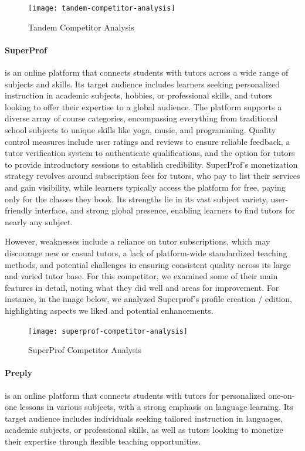 \begin{figure}[h]
    \centering
    \texttt{[image: tandem-competitor-analysis]}
    \caption{Tandem Competitor Analysis}
    \label{fig:figure8}
\end{figure}

\paragraph{SuperProf} is an online platform that connects students with tutors across a wide range of subjects and skills.
Its target audience includes learners seeking personalized instruction in academic subjects, hobbies, or professional skills, and tutors looking to offer their expertise to a global audience.
The platform supports a diverse array of course categories, encompassing everything from traditional school subjects to unique skills like yoga, music, and programming.
Quality control measures include user ratings and reviews to ensure reliable feedback, a tutor verification system to authenticate qualifications, and the option for tutors to provide introductory sessions to establish credibility.
SuperProf's monetization strategy revolves around subscription fees for tutors, who pay to list their services and gain visibility, while learners typically access the platform for free, paying only for the classes they book.
Its strengths lie in its vast subject variety, user-friendly interface, and strong global presence, enabling learners to find tutors for nearly any subject.

However, weaknesses include a reliance on tutor subscriptions, which may discourage new or casual tutors, a lack of platform-wide standardized teaching methods, and potential challenges in ensuring consistent quality across its large and varied tutor base.
For this competitor, we examined some of their main features in detail, noting what they did well and areas for improvement.
For instance, in the image below, we analyzed Superprof's profile creation / edition, highlighting aspects we liked and potential enhancements.

\begin{figure}[h]
    \centering
    \texttt{[image: superprof-competitor-analysis]}
    \caption{SuperProf Competitor Analysis}
    \label{fig:figure9}
\end{figure}

\paragraph{Preply} is an online platform that connects students with tutors for personalized one-on-one lessons in various subjects, with a strong emphasis on language learning.
Its target audience includes individuals seeking tailored instruction in languages, academic subjects, or professional skills, as well as tutors looking to monetize their expertise through flexible teaching opportunities.

